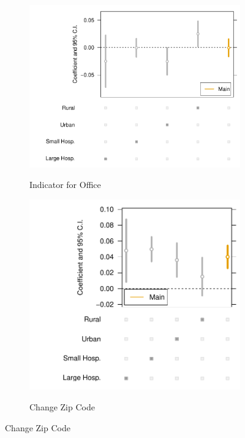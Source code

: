 \documentclass[12pt]{article}
\begin{document}
\begin{figure}[t!]
\medskip
\begin{subfigure}{0.48\textwidth}
\caption{Indicator for Office }
\includegraphics[width=\linewidth]{Objects/office_heterog.pdf}
 \label{fig:c}
\end{subfigure}\hspace*{\fill}
\begin{subfigure}{0.48\textwidth}
\caption{Change Zip Code} 
\includegraphics[width=\linewidth]{Objects/change_zip_heterog.pdf}
\label{fig:d}
\end{subfigure}


\end{figure}
\end{document}
